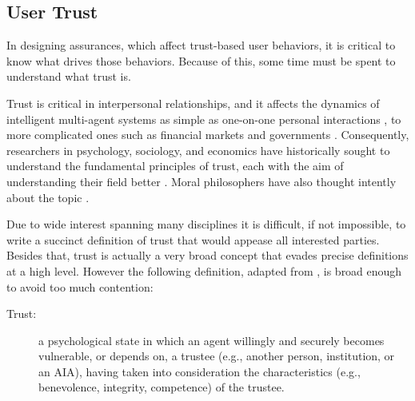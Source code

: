 \subsection{User Trust} \label{sec:trust}
    In designing assurances, which affect trust-based user behaviors, it is critical to know what drives those behaviors. Because of this, some time must be spent to understand what trust is. 

    Trust is critical in interpersonal relationships, and it affects the dynamics of intelligent multi-agent systems as simple as one-on-one personal interactions  \cite{Lewicki2006-hj}, to more complicated ones such as financial markets and governments \cite{Fukuyama1995-un}. Consequently, researchers in psychology, sociology, and economics have historically sought to understand the fundamental principles of trust, each with the aim of understanding their field better \cite{Gambetta1988-pi}. Moral philosophers have also thought intently about the topic \cite{Baier1986-im}.

    Due to wide interest spanning many disciplines it is difficult, if not impossible, to write a succinct definition of trust that would appease all interested parties. Besides that, trust is actually a very broad concept that evades precise definitions at a high level. However the following definition, adapted from \cite{McKnight2004-vv}, is broad enough to avoid too much contention:

    \begin{description}
        \item [Trust:] a psychological state in which an agent willingly and securely becomes vulnerable, or depends on, a trustee (e.g., another person, institution, or an AIA), having taken into consideration the characteristics (e.g., benevolence, integrity, competence) of the trustee.
    \end{description}

